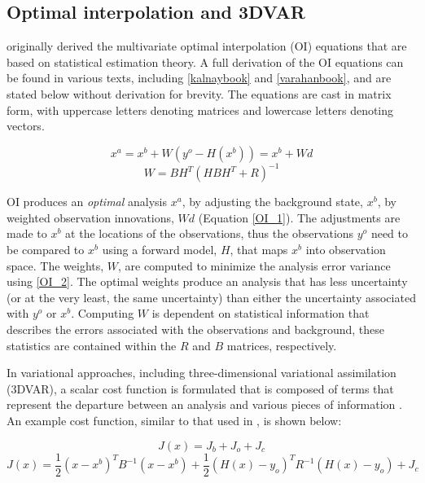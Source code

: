 \subsection{Optimal interpolation and 3DVAR}
\citet{gandin63} originally derived the multivariate optimal interpolation (OI) equations that are based on statistical estimation theory. A full derivation of the OI equations can be found in various texts, including \ref{kalnaybook} and \ref{varahanbook}, and are stated below without derivation for brevity. The equations are cast in matrix form, with uppercase letters denoting matrices and lowercase letters denoting vectors.

\begin{equation}
   x^a = x^b + W(y^o - H(x^b)) = x^b + Wd
\label{OI_1}
\end{equation}
\begin{equation}
\label{OI_2}
   W = BH^T(HBH^T + R)^{-1}
\end{equation}

OI produces an {\it optimal} analysis  \(x^a\), by adjusting the background state, \(x^b\), by weighted observation innovations, \(Wd\) (Equation \ref{OI_1}). The adjustments are made to \(x^b\) at the locations of the observations, thus the observations \(y^o\) need to be compared to \(x^b\) using a forward model, \(H\), that maps \(x^b\) into observation space. The weights, \(W\), are computed to minimize the analysis error variance using \ref{OI_2}. The optimal weights produce an analysis that has less uncertainty (or at the very least, the same uncertainty) than either the uncertainty associated with \(y^o\) or \(x^b\). Computing \(W\) is dependent on statistical information that describes the errors associated with the observations and background, these statistics are contained within the \(R\) and \(B\) matrices, respectively.

In variational approaches, including three-dimensional variational assimilation (3DVAR), a scalar cost function is formulated that is composed of terms that represent the departure between an analysis and various pieces of information \citep{sasaki70}. An example cost function, similar to that used in \citet{gaoetal03}, is shown below:

\begin{equation}
\label{3DVAR}
   J(x) = J_b + J_o + J_c
\end{equation}
\begin{equation}
\label{3DVAR2}
   J(x) = \frac{1}{2}(x - x^b)^TB^{-1}(x - x^b) + \frac{1}{2}(H(x) - y_o)^TR^{-1}(H(x) - y_o) + J_c
\end{equation}

